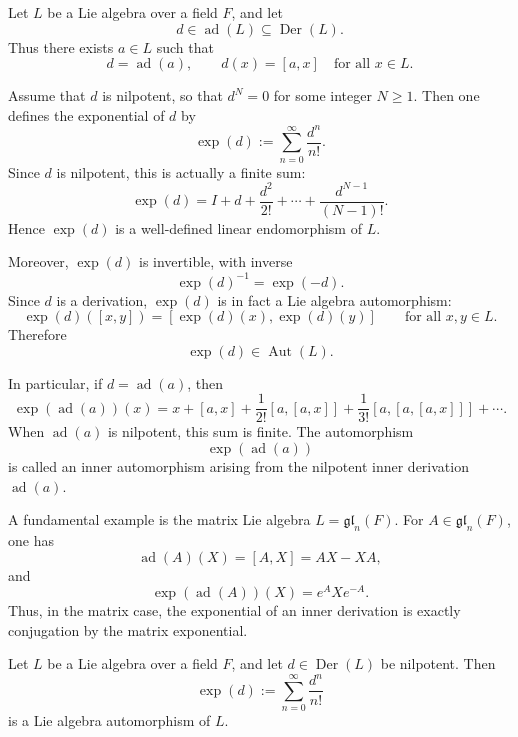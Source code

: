 \begin{remark}
    Let $L$ be a Lie algebra over a field $F$, and let
    \[
        d \in \operatorname{ad}(L) \subseteq \operatorname{Der}(L).
    \]
    Thus there exists $a \in L$ such that
    \[
        d=\operatorname{ad}(a), \qquad d(x)=[a,x] \quad \text{for all } x\in L.
    \]

    Assume that $d$ is nilpotent, so that $d^N=0$ for some integer $N\ge 1$.
    Then one defines the exponential of $d$ by
    \[
        \exp(d):=\sum_{n=0}^{\infty}\frac{d^n}{n!}.
    \]
    Since $d$ is nilpotent, this is actually a finite sum:
    \[
        \exp(d)=I+d+\frac{d^2}{2!}+\cdots+\frac{d^{N-1}}{(N-1)!}.
    \]
    Hence $\exp(d)$ is a well-defined linear endomorphism of $L$.

    Moreover, $\exp(d)$ is invertible, with inverse
    \[
        \exp(d)^{-1}=\exp(-d).
    \]
    Since $d$ is a derivation, $\exp(d)$ is in fact a Lie algebra automorphism:
    \[
        \exp(d)([x,y])=[\exp(d)(x),\exp(d)(y)]
        \qquad \text{for all } x,y\in L.
    \]
    Therefore
    \[
        \exp(d)\in \operatorname{Aut}(L).
    \]

    In particular, if $d=\operatorname{ad}(a)$, then
    \[
        \exp(\operatorname{ad}(a))(x)
        =
        x+[a,x]+\frac{1}{2!}[a,[a,x]]+\frac{1}{3!}[a,[a,[a,x]]]+\cdots.
    \]
    When $\operatorname{ad}(a)$ is nilpotent, this sum is finite. The automorphism
    \[
        \exp(\operatorname{ad}(a))
    \]
    is called an inner automorphism arising from the nilpotent inner derivation $\operatorname{ad}(a)$.

    A fundamental example is the matrix Lie algebra $L=\mathfrak{gl}_n(F)$. For $A\in \mathfrak{gl}_n(F)$, one has
    \[
        \operatorname{ad}(A)(X)=[A,X]=AX-XA,
    \]
    and
    \[
        \exp(\operatorname{ad}(A))(X)=e^A X e^{-A}.
    \]
    Thus, in the matrix case, the exponential of an inner derivation is exactly conjugation by the matrix exponential.
\end{remark}

\begin{proposition}
    Let $L$ be a Lie algebra over a field $F$, and let $d\in \operatorname{Der}(L)$ be nilpotent. Then
    \[
        \exp(d):=\sum_{n=0}^{\infty}\frac{d^n}{n!}
    \]
    is a Lie algebra automorphism of $L$.
\end{proposition}

